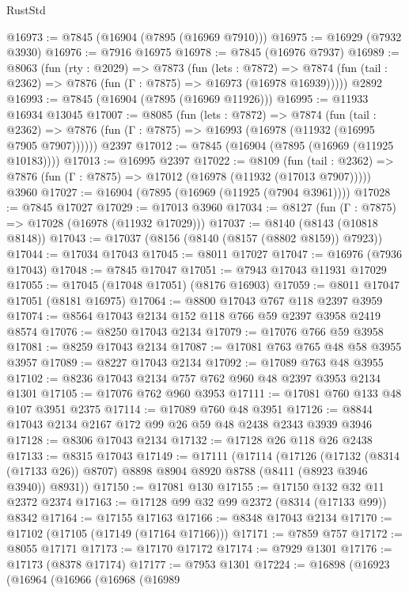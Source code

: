 \begin{lexlean}{RustStd}
\begin{coremodule}
@16973 := @7845 (@16904 (@7895 (@16969 @7910)))
@16975 := @16929 (@7932 @3930)
@16976 := @7916 @16975
@16978 := @7845 (@16976 @7937)
@16989 := @8063
    (fun (rty : @2029) =>
    @7873
      (fun (lets : @7872) =>
      @7874 (fun (tail : @2362) => @7876 (fun (Γ : @7875) => @16973 (@16978 @16939)))))
    @2892
@16993 := @7845 (@16904 (@7895 (@16969 @11926)))
@16995 := @11933 @16934 @13045
@17007 := @8085
    (fun (lets : @7872) =>
    @7874
      (fun (tail : @2362) =>
      @7876 (fun (Γ : @7875) => @16993 (@16978 (@11932 (@16995 @7905 @7907))))))
    @2397
@17012 := @7845 (@16904 (@7895 (@16969 (@11925 @10183))))
@17013 := @16995 @2397
@17022 := @8109
    (fun (tail : @2362) => @7876 (fun (Γ : @7875) => @17012 (@16978 (@11932 (@17013 @7907)))))
    @3960
@17027 := @16904 (@7895 (@16969 (@11925 (@7904 @3961))))
@17028 := @7845 @17027
@17029 := @17013 @3960
@17034 := @8127 (fun (Γ : @7875) => @17028 (@16978 (@11932 @17029)))
@17037 := @8140 (@8143 (@10818 @8148))
@17043 := @17037 (@8156 (@8140 (@8157 (@8802 @8159)) @7923))
@17044 := @17034 @17043
@17045 := @8011 @17027
@17047 := @16976 (@7936 @17043)
@17048 := @7845 @17047
@17051 := @7943 @17043 @11931 @17029
@17055 := @17045 (@17048 @17051) (@8176 @16903)
@17059 := @8011 @17047 @17051 (@8181 @16975)
@17064 := @8800 @17043 @767 @118 @2397 @3959
@17074 := @8564 @17043 @2134 @152 @118 @766 @59 @2397 @3958 @2419 @8574
@17076 := @8250 @17043 @2134
@17079 := @17076 @766 @59 @3958
@17081 := @8259 @17043 @2134
@17087 := @17081 @763 @765 @48 @58 @3955 @3957
@17089 := @8227 @17043 @2134
@17092 := @17089 @763 @48 @3955
@17102 := @8236 @17043 @2134 @757 @762 @960 @48 @2397 @3953 @2134 @1301
@17105 := @17076 @762 @960 @3953
@17111 := @17081 @760 @133 @48 @107 @3951 @2375
@17114 := @17089 @760 @48 @3951
@17126 := @8844 @17043 @2134 @2167 @172 @99 @26 @59 @48 @2438 @2343 @3939 @3946
@17128 := @8306 @17043 @2134
@17132 := @17128 @26 @118 @26 @2438
@17133 := @8315 @17043
@17149 := @17111
    (@17114
      (@17126
        (@17132 (@8314 (@17133 @26)) @8707)
        @8898
        @8904
        @8920
        @8788
        (@8411 (@8923 @3946 @3940))
        @8931))
@17150 := @17081 @130
@17155 := @17150 @132 @32 @11 @2372 @2374
@17163 := @17128 @99 @32 @99 @2372 (@8314 (@17133 @99)) @8342
@17164 := @17155 @17163
@17166 := @8348 @17043 @2134
@17170 := @17102 (@17105 (@17149 (@17164 @17166)))
@17171 := @7859 @757
@17172 := @8055 @17171
@17173 := @17170 @17172
@17174 := @7929 @1301
@17176 := @17173 (@8378 @17174)
@17177 := @7953 @1301
@17224 := @16898
    (@16923
      (@16964
        (@16966
          (@16968
            (@16989

\end{coremodule}
\end{lexlean}
